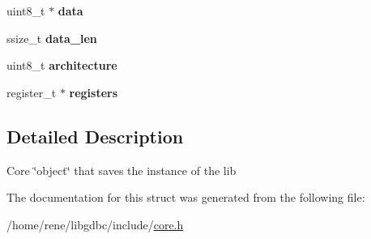 \begin{DoxyCompactItemize}
\item 
\hypertarget{structlibgdbc__t_a61c24427eefea3943a9902d4a7363bfa}{uint8\-\_\-t $\ast$ {\bfseries data}}\label{structlibgdbc__t_a61c24427eefea3943a9902d4a7363bfa}

\item 
\hypertarget{structlibgdbc__t_af3a5a5276620688735ae40f36d2d6ad6}{ssize\-\_\-t {\bfseries data\-\_\-len}}\label{structlibgdbc__t_af3a5a5276620688735ae40f36d2d6ad6}

\item 
\hypertarget{structlibgdbc__t_a29dd9806b92c118e333dda469034ff7f}{uint8\-\_\-t {\bfseries architecture}}\label{structlibgdbc__t_a29dd9806b92c118e333dda469034ff7f}

\item 
\hypertarget{structlibgdbc__t_a8b1c7559fb32fd13fa4f78b4b4b45a1c}{register\-\_\-t $\ast$ {\bfseries registers}}\label{structlibgdbc__t_a8b1c7559fb32fd13fa4f78b4b4b45a1c}

\end{DoxyCompactItemize}


\subsection{Detailed Description}
Core \char`\"{}object\char`\"{} that saves the instance of the lib 

The documentation for this struct was generated from the following file\-:\begin{DoxyCompactItemize}
\item 
/home/rene/libgdbc/include/\hyperlink{core_8h}{core.\-h}\end{DoxyCompactItemize}
